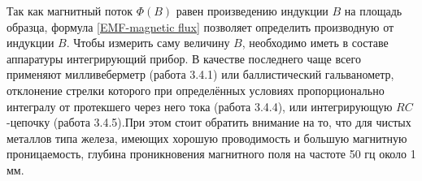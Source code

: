 Так как магнитный поток $\Phi (B)$ равен произведению индукции $B$ на площадь образца, формула \eqref{EMF-magnetic flux} позволяет определить производную от индукции $B$. Чтобы измерить саму величину $B$, необходимо иметь в составе аппаратуры интегрирующий прибор. В качестве последнего чаще всего применяют милливеберметр (работа 3.4.1) или баллистический гальванометр, отклонение стрелки которого при определённых условиях пропорционально интегралу от протекшего через него тока (работа 3.4.4), или интегрирующую $RC$-цепочку (работа 3.4.5).При этом стоит обратить внимание на то, что для чистых металлов типа железа, имеющих хорошую проводимость и большую магнитную проницаемость, глубина проникновения магнитного поля на частоте 50 гц около 1 мм. 

